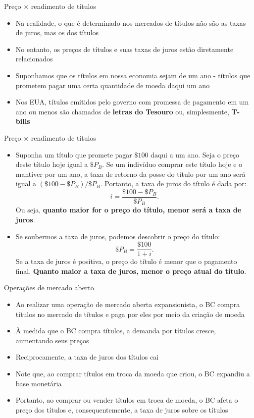 \documentclass[10pt]{beamer}
\begin{document}
\begin{frame}{Preço $\times$ rendimento de títulos}
    \begin{itemize}
        \item Na realidade, o que é determinado nos mercados de títulos não são as taxas de juros, mas os  dos títulos
        \bigskip
        \item No entanto, os preços de títulos e suas taxas de juros estão diretamente relacionados
        \bigskip
        \item Suponhamos que os títulos em nossa economia sejam de um ano - títulos que prometem pagar uma certa quantidade de moeda daqui um ano
        \bigskip
        \item Nos EUA, títulos emitidos pelo governo com promessa de pagamento em um ano ou menos são chamados de \textbf{letras do Tesouro} ou, simplesmente, \textbf{T-bills}
    \end{itemize}
\end{frame}

\begin{frame}{Preço $\times$ rendimento de títulos}
\begin{itemize}
    \item Suponha um título que promete pagar $\$ 100$ daqui a um ano. Seja o preço deste título hoje igual a $\$ P_B$. Se um indivíduo comprar este título hoje e o mantiver por um ano, a taxa de retorno da posse do título por um ano será igual a $(\$ 100 - \$P_B)/\$ P_B$. Portanto, a taxa de juros do título é dada por:
    \[
    i = \frac{\$ 100 - \$P_B}{\$P_B}.
    \]
    Ou seja, \textbf{quanto maior for o preço do título, menor será a taxa de juros}.
    \bigskip
    \item Se soubermos a taxa de juros, podemos descobrir o preço do título:
    \[
    \$P_B = \frac{\$100}{1 + i}.
    \]
    Se a taxa de juros é positiva, o preço do título é menor que o pagamento final. \textbf{Quanto maior a taxa de juros, menor o preço atual do título}.
\end{itemize}
\end{frame}

\begin{frame}{Operações de mercado aberto}
    \begin{itemize}
        \item Ao realizar uma operação de mercado aberta expansionista, o BC compra títulos no mercado de títulos e paga por eles por meio da criação de moeda
        \bigskip
        \item À medida que o BC compra títulos, a demanda por títulos cresce, aumentando seus preços
        \bigskip
        \item Reciprocamente, a taxa de juros dos títulos cai
        \bigskip
        \item Note que, ao comprar títulos em troca da moeda que criou, o BC expandiu a base monetária
        \bigskip
        \item Portanto, ao comprar ou vender títulos em troca de moeda, o BC afeta o preço dos títulos e, consequentemente, a taxa de juros sobre os títulos
    \end{itemize}
\end{frame}
\end{document}
